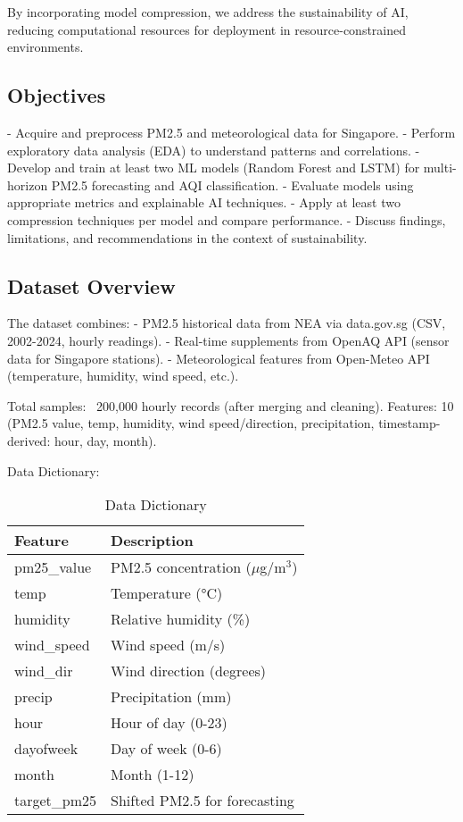 \documentclass{article}
\begin{document}
By incorporating model compression, we address the sustainability of AI, reducing computational resources for deployment in resource-constrained environments.

\subsection{Objectives}
- Acquire and preprocess PM2.5 and meteorological data for Singapore.
- Perform exploratory data analysis (EDA) to understand patterns and correlations.
- Develop and train at least two ML models (Random Forest and LSTM) for multi-horizon PM2.5 forecasting and AQI classification.
- Evaluate models using appropriate metrics and explainable AI techniques.
- Apply at least two compression techniques per model and compare performance.
- Discuss findings, limitations, and recommendations in the context of sustainability.

\subsection{Dataset Overview}
The dataset combines:
- PM2.5 historical data from NEA via data.gov.sg (CSV, 2002-2024, hourly readings).
- Real-time supplements from OpenAQ API (sensor data for Singapore stations).
- Meteorological features from Open-Meteo API (temperature, humidity, wind speed, etc.).

Total samples: ~200,000 hourly records (after merging and cleaning). Features: 10 (PM2.5 value, temp, humidity, wind speed/direction, precipitation, timestamp-derived: hour, day, month).

Data Dictionary:
\begin{table}[h]
\centering
\begin{tabularx}{\textwidth}{lX}
\toprule
Feature & Description \\
\midrule
pm25\_value & PM2.5 concentration ($\mu$g/m$^3$) \\
temp & Temperature (°C) \\
humidity & Relative humidity (\%) \\
wind\_speed & Wind speed (m/s) \\
wind\_dir & Wind direction (degrees) \\
precip & Precipitation (mm) \\
hour & Hour of day (0-23) \\
dayofweek & Day of week (0-6) \\
month & Month (1-12) \\
target\_pm25 & Shifted PM2.5 for forecasting \\
\bottomrule
\end{tabularx}
\caption{Data Dictionary}
\end{table}
\end{document}
